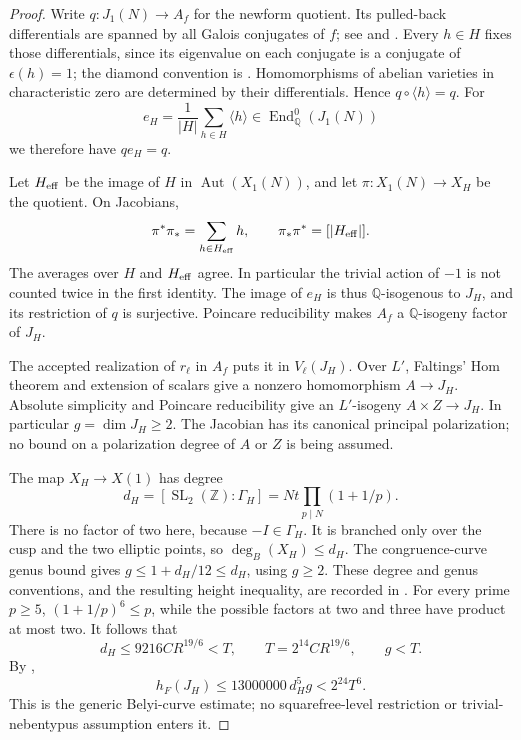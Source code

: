 \begin{proof}
Write $q:J_1(N)\to A_f$ for the newform quotient. Its pulled-back
differentials are spanned by all Galois conjugates of $f$; see
\cite[Theorem~1(i),(iv), p.~526]{shimura-factors} and
\cite[\S3.1]{baker-et-al-finiteness}. Every $h\in H$ fixes those differentials,
since its eigenvalue on each conjugate is a conjugate of $\epsilon(h)=1$;
the diamond convention is \cite[\S3.2.1]{baker-et-al-finiteness}.
Homomorphisms of abelian varieties in characteristic zero are determined
by their differentials. Hence $q\circ\langle h\rangle=q$.
For
\[
 e_H=\frac1{|H|}\sum_{h\in H}\langle h\rangle
       \in\operatorname{End}_{\mathbb Q}^0(J_1(N))
\]
we therefore have $qe_H=q$.

Let $H_{\rm eff}$ be the image of $H$ in
$\operatorname{Aut}(X_1(N))$, and let $\pi:X_1(N)\to X_H$ be the quotient.
On Jacobians,
\[
 \pi^*\pi_*=\sum_{h\in H_{\rm eff}}h,\qquad
 \pi_*\pi^*=[|H_{\rm eff}|].
\]
The averages over $H$ and $H_{\rm eff}$ agree. In particular the trivial
action of $-1$ is not counted twice in the first identity.
The image of $e_H$ is thus $\mathbb Q$-isogenous to $J_H$, and its
restriction of $q$ is surjective. Poincare reducibility makes $A_f$
a $\mathbb Q$-isogeny factor of $J_H$.

The accepted realization of $r_\ell$ in $A_f$ puts it in $V_\ell(J_H)$.
Over $L'$, Faltings' Hom theorem and extension of scalars give a nonzero
homomorphism $A\to J_H$. Absolute simplicity and Poincare reducibility
give an $L'$-isogeny $A\times Z\to J_H$. In particular
$g=\dim J_H\ge2$. The Jacobian has its canonical principal polarization;
no bound on a polarization degree of $A$ or $Z$ is being assumed.

The map $X_H\to X(1)$ has degree
\[
 d_H=[\operatorname{SL}_2(\mathbb Z):\Gamma_H]
     =Nt\prod_{p\mid N}(1+1/p).
\]
There is no factor of two here, because $-I\in\Gamma_H$.
It is branched only over the cusp and the two elliptic points, so
$\deg_B(X_H)\le d_H$. The congruence-curve genus bound gives
$g\le1+d_H/12\le d_H$, using $g\ge2$.
These degree and genus conventions, and the resulting height inequality,
are recorded in \cite[\S4, (4.1)--(4.2), p.~8]{vonKaenel2021}.
For every prime $p\ge5$, $(1+1/p)^6\le p$, while the possible factors
at two and three have product at most two. It follows that
\[
 d_H\le9216CR^{19/6}<T,\qquad
 T=2^{14}CR^{19/6},\qquad g<T.
\]
By \cite[Theorem~1.1.1 and \S2.3]{javanpeykar},
\[
 h_F(J_H)\le13000000\,d_H^5g<2^{24}T^6.
\]
This is the generic Belyi-curve estimate; no squarefree-level restriction
or trivial-nebentypus assumption enters it.


\end{proof}
